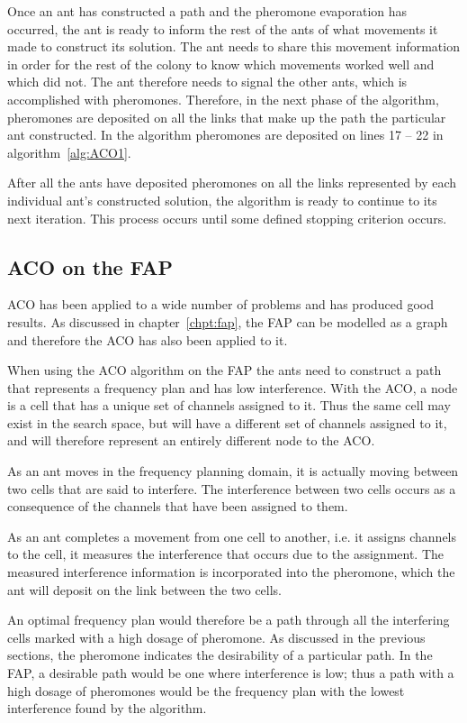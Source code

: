 Once an ant has constructed a path and the pheromone evaporation has occurred, the ant is ready to inform the rest of the ants of what movements it made to construct its solution. The ant needs to share this movement information in order for the rest of the colony to know which movements worked well and which did not. The ant therefore needs to signal the other ants, which is accomplished with pheromones. Therefore, in the next phase of the algorithm, pheromones are deposited on all the links that make up the path the particular ant constructed. In the algorithm pheromones are deposited on lines 17 -- 22 in algorithm~\ref{alg:ACO1}.

After all the ants have deposited pheromones on all the links represented by each individual ant's constructed solution, the algorithm is ready to continue to its next iteration. This process occurs until some defined stopping criterion occurs.

\subsection{ACO on the \gls{FAP}}
ACO has been applied to a wide number of problems and has produced good results. As discussed in chapter~\ref{chpt:fap}, the \gls{FAP} can be modelled as a graph and therefore the \gls{ACO} has also been applied to it.

When using the \gls{ACO} algorithm on the \gls{FAP} the ants need to construct a path that represents a frequency plan and has low interference. With the \gls{ACO}, a node is a cell that has a unique set of channels assigned to it. Thus the same cell may exist in the search space, but will have a different set of channels assigned to it, and will therefore represent an entirely different node to the \gls{ACO}.

As an ant moves in the frequency planning domain, it is actually moving between two cells that are said to interfere. The interference between two cells occurs as a consequence of the channels that have been assigned to them. 

As an ant completes a movement from one cell to another, i.e. it assigns channels to the cell, it measures the interference that occurs due to the assignment.  The measured interference information is incorporated into the pheromone, which the ant will deposit on the link between the two cells.

An optimal frequency plan would therefore be a path through all the interfering cells marked with a high dosage of pheromone. As discussed in the previous sections, the pheromone indicates the desirability of a particular path. In the \gls{FAP}, a desirable path would be one where interference is low; thus a path with a high dosage of pheromones would be the frequency plan with the lowest interference found by the algorithm.


